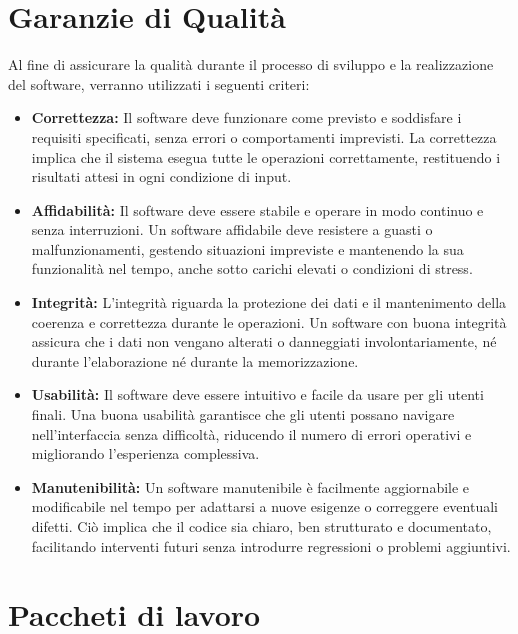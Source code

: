 \documentclass[a4paper,12pt]{article}
\begin{document}
\section{Garanzie di Qualità} %
Al fine di assicurare la qualità durante il processo di sviluppo e la realizzazione del software,
verranno utilizzati i seguenti criteri:  
\begin{itemize}
    \item \textbf{Correttezza:}  
    Il software deve funzionare come previsto e soddisfare i requisiti specificati, senza errori o comportamenti imprevisti. La correttezza implica che il sistema esegua tutte le operazioni correttamente, restituendo i risultati attesi in ogni condizione di input.

    \item \textbf{Affidabilità:}  
    Il software deve essere stabile e operare in modo continuo e senza interruzioni. Un software affidabile deve resistere a guasti o malfunzionamenti, gestendo situazioni impreviste e mantenendo la sua funzionalità nel tempo, anche sotto carichi elevati o condizioni di stress.

    \item \textbf{Integrità:}  
    L'integrità riguarda la protezione dei dati e il mantenimento della coerenza e correttezza durante le operazioni. Un software con buona integrità assicura che i dati non vengano alterati o danneggiati involontariamente, né durante l'elaborazione né durante la memorizzazione.

    \item \textbf{Usabilità:}  
    Il software deve essere intuitivo e facile da usare per gli utenti finali. Una buona usabilità garantisce che gli utenti possano navigare nell'interfaccia senza difficoltà, riducendo il numero di errori operativi e migliorando l'esperienza complessiva.

    \item \textbf{Manutenibilità:}  
    Un software manutenibile è facilmente aggiornabile e modificabile nel tempo per adattarsi a nuove esigenze o correggere eventuali difetti. Ciò implica che il codice sia chiaro, ben strutturato e documentato, facilitando interventi futuri senza introdurre regressioni o problemi aggiuntivi.
\end{itemize}

\section{Paccheti di lavoro} %
\end{document}

